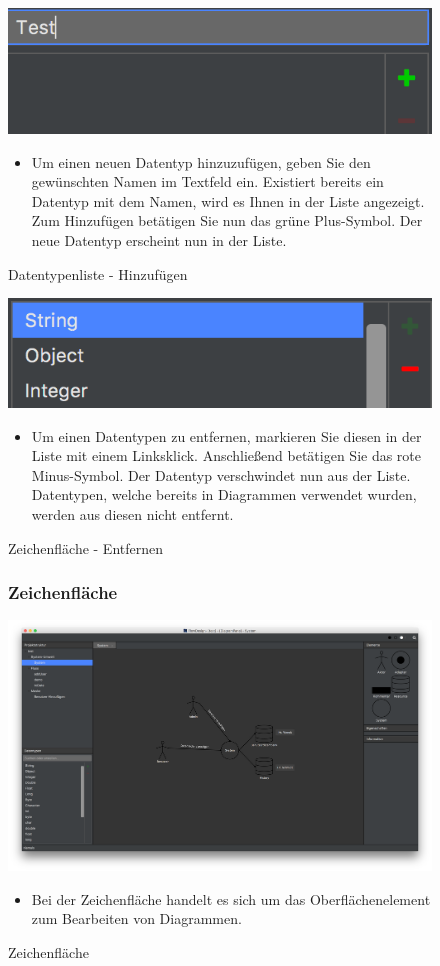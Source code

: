 \begin{figure}[h!]
	\centering
	\includegraphics[width=.4\textwidth]{Datentypen_Add.png}
	\caption{Datentypenliste - Hinzufügen}
\begin{itemize}	
\item Um einen neuen Datentyp hinzuzufügen, geben Sie den gewünschten Namen im Textfeld ein. Existiert bereits ein Datentyp mit dem Namen, wird es Ihnen in der Liste angezeigt. Zum Hinzufügen betätigen Sie nun das grüne Plus-Symbol. Der neue Datentyp erscheint nun in der Liste.
\end{itemize}
\end{figure}

\begin{figure}[h!]
	\centering
	\includegraphics[width=.4\textwidth]{Datentypen_Delete.png}
	\caption{Zeichenfläche - Entfernen}
\begin{itemize}	
\item Um einen Datentypen zu entfernen, markieren Sie diesen in der Liste mit einem Linksklick. Anschließend betätigen Sie das rote Minus-Symbol. Der Datentyp verschwindet nun aus der Liste. Datentypen, welche bereits in Diagrammen verwendet wurden, werden aus diesen nicht entfernt.
\end{itemize}
\end{figure}




\begin{figure}[h!]
\subsubsection{Zeichenfläche}
	\centering
	\includegraphics[width=1\textwidth]{Design_Dark.png}
	\caption{Zeichenfläche}	
\begin{itemize}	
\item Bei der Zeichenfläche handelt es sich um das Oberflächenelement zum Bearbeiten von Diagrammen. 
\end{itemize}
\end{figure}

